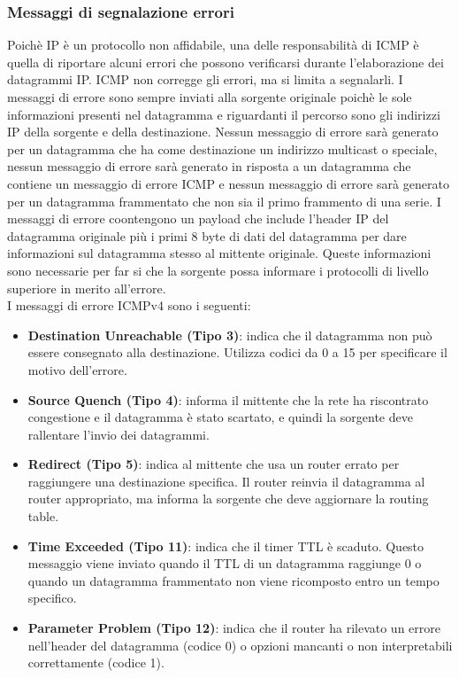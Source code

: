 \documentclass[12pt]{report}
\begin{document}
\subsubsection{Messaggi di segnalazione errori}
Poichè IP è un protocollo non affidabile, una delle responsabilità di ICMP è quella di riportare alcuni errori che possono verificarsi durante l'elaborazione dei datagrammi IP. ICMP non corregge gli errori, ma si limita a segnalarli. I messaggi di errore sono sempre inviati alla sorgente originale poichè le sole informazioni presenti nel datagramma e riguardanti il percorso sono gli indirizzi IP della sorgente e della destinazione. Nessun messaggio di errore sarà generato per un datagramma che ha come destinazione un indirizzo multicast o speciale, nessun messaggio di errore sarà generato in risposta a un datagramma che contiene un messaggio di errore ICMP e nessun messaggio di errore sarà generato per un datagramma frammentato che non sia il primo frammento di una serie. I messaggi di errore coontengono un payload che include l'header IP del datagramma originale più i primi 8 byte di dati del datagramma per dare informazioni sul datagramma stesso al mittente originale. Queste informazioni sono necessarie per far si che la sorgente possa informare i protocolli di livello superiore in merito all'errore.
\vspace{\baselineskip}\\
I messaggi di errore ICMPv4 sono i seguenti:
\begin{itemize}
	\item \textbf{Destination Unreachable (Tipo 3)}: indica che il datagramma non può essere consegnato alla destinazione. Utilizza codici da 0 a 15 per specificare il motivo dell'errore.
	\item \textbf{Source Quench (Tipo 4)}: informa il mittente che la rete ha riscontrato congestione e il datagramma è stato scartato, e quindi la sorgente deve rallentare l'invio dei datagrammi.
	\item \textbf{Redirect (Tipo 5)}: indica al mittente che usa un router errato per raggiungere una destinazione specifica. Il router reinvia il datagramma al router appropriato, ma informa la sorgente che deve aggiornare la routing table.
	\item \textbf{Time Exceeded (Tipo 11)}: indica che il timer TTL è scaduto. Questo messaggio viene inviato quando il TTL di un datagramma raggiunge 0 o quando un datagramma frammentato non viene ricomposto entro un tempo specifico.
	\item \textbf{Parameter Problem (Tipo 12)}: indica che il router ha rilevato un errore nell'header  del datagramma (codice 0) o opzioni mancanti o non interpretabili correttamente (codice 1).
\end{itemize}
\end{document}
